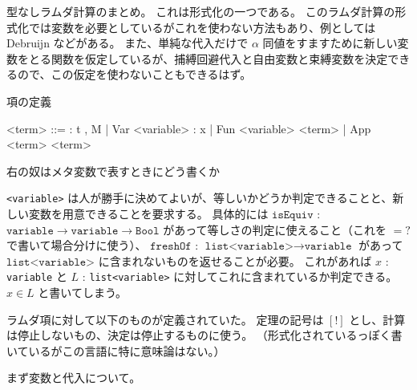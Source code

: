 \documentclass[dvipdfmx]{jsarticle}
\begin{document}
型なしラムダ計算のまとめ。
これは形式化の一つである。
このラムダ計算の形式化では変数を必要としているがこれを使わない方法もあり、例としては Debruijn などがある。
また、単純な代入だけで \(\alpha\) 同値をすますために新しい変数をとる関数を仮定しているが、捕縛回避代入と自由変数と束縛変数を決定できるので、この仮定を使わないこともできるはず。

\begin{itembox}[l]{項の定義}
  \begin{bnfgrammar}
    <term> ::= : t , M
    | Var <variable> : x
    | Fun <variable> <term>
    | App <term> <term>
  \end{bnfgrammar}
  右の奴はメタ変数で表すときにどう書くか
\end{itembox}

\texttt{<variable>} は人が勝手に決めてよいが、等しいかどうか判定できることと、新しい変数を用意できることを要求する。
具体的には \(\texttt{isEquiv}\) : \(\texttt{variable} \to \texttt{variable} \to \texttt{Bool}\) があって等しさの判定に使えること（これを \(=?\) で書いて場合分けに使う）、 \(\texttt{freshOf}\) : \(\texttt{list<variable>} \to \texttt{variable}\) があって \(\texttt{list<variable>}\) に含まれないものを返せることが必要。
これがあれば \(x\) : \texttt{variable} と \(L\) : \texttt{list<variable>} に対してこれに含まれているか判定できる。
\(x \in L\) と書いてしまう。

ラムダ項に対して以下のものが定義されていた。
定理の記号は \([!]\) とし、計算は停止しないもの、決定は停止するものに使う。
（形式化されているっぽく書いているがこの言語に特に意味論はない。）

まず変数と代入について。
\end{document}
